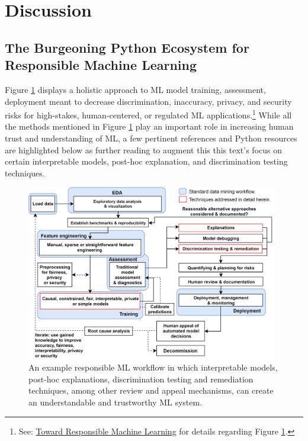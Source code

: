 \documentclass[information,article,submit,moreauthors,pdftex]{definitions/mdpi}
\begin{document}
\section{Discussion}\label{sec:disc}

\subsection{The Burgeoning Python Ecosystem for Responsible Machine Learning}

Figure \ref{fig:blueprint} displays a holistic approach to ML model training, assessment, deployment meant to decrease discrimination, inaccuracy, privacy, and security risks for high-stakes, human-centered, or regulated ML applications.\footnote{See: \href{https://github.com/jphall663/hc_ml}{Toward Responsible Machine Learning} for details regarding Figure \ref{fig:blueprint}.} While all the methods mentioned in Figure \ref{fig:blueprint} play an important role in increasing human trust and understanding of ML, a few pertinent references and Python resources are highlighted below as further reading to augment this this text's focus on certain interpretable models, post-hoc explanation, and discrimination testing techniques.   

\begin{figure}[H]
	\centering
	\includegraphics[width=11cm]{img/blueprint.png}
	\caption{An example responsible ML workflow in which interpretable models, post-hoc explanations, discrimination testing and remediation techniques, among other review and appeal mechanisms, can create an understandable and trustworthy ML system.}
	\label{fig:blueprint}
\end{figure} 
\end{document}
